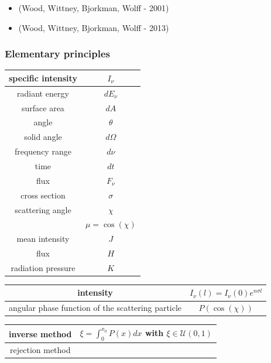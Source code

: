 \documentclass[10pt,a4paper]{article}
\begin{document}
\begin{itemize}
\item (Wood, Wittney, Bjorkman, Wolff - 2001)
\item (Wood, Wittney, Bjorkman, Wolff - 2013)
\end{itemize}

\subsubsection{Elementary principles}

\begin{center}
\centering
{\tabulinesep=1.5mm
\begin{tabu}{|c|c|}
\hline 
specific intensity & $I_{\nu}$ \\ \hline
radiant energy & $dE_{\nu}$ \\ \hline
surface area & $dA$ \\ \hline
angle & $\theta$ \\ \hline
solid angle & $d \Omega$ \\ \hline
frequency range & $d \nu$ \\ \hline
time & $dt$ \\ \hline
flux & $F_{\nu}$ \\ \hline
cross section & $\sigma$ \\ \hline
scattering angle & $\chi$ \\ 
 & $\mu = \cos(\chi)$ \\ \hline
mean intensity & $J$ \\ \hline
flux & $H$ \\ \hline
radiation pressure & $K$ \\ \hline
\end{tabu}}
\end{center}


\begin{center}
\centering
{\tabulinesep=1.5mm
\begin{tabu}{|c|c|}
\hline 
intensity & $I_{\nu}(l) = I_{\nu}(0)e^{n \sigma l}$ \\ \hline
angular phase function of the scattering particle & $P(\cos(\chi))$ \\ \hline

\end{tabu}}
\end{center}

\begin{center}
\centering
{\tabulinesep=1.5mm
\begin{tabu}{|c|c|}
\hline 
inverse method & $\xi = \int_0 ^{x_0} P(x) dx $ with $\xi \in \mathcal{U}(0,1)$ \\ \hline

rejection method & \\ \hline
\end{tabu}}
\end{center}
\end{document}
